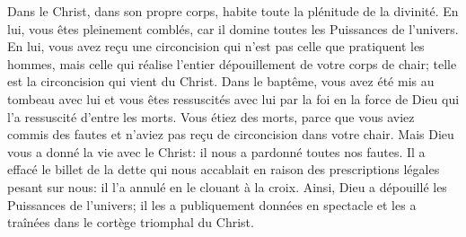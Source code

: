 Dans le Christ, dans son propre corps, habite toute la plénitude de la divinité.
En lui, vous êtes pleinement comblés, car il domine toutes les Puissances de l’univers.
En lui, vous avez reçu une circoncision qui n’est pas celle que pratiquent les hommes,
	mais celle qui réalise l’entier dépouillement de votre corps de chair;
	telle est la circoncision qui vient du Christ.
Dans le baptême, vous avez été mis au tombeau avec lui et vous êtes ressuscités avec lui
	par la foi en la force de Dieu qui l’a ressuscité d’entre les morts.
Vous étiez des morts, parce que vous aviez commis des fautes
	et n’aviez pas reçu de circoncision dans votre chair.
Mais Dieu vous a donné la vie avec le Christ:
	il nous a pardonné toutes nos fautes.
Il a effacé le billet de la dette qui nous accablait
		en raison des prescriptions légales pesant sur nous:
	il l’a annulé en le clouant à la croix.
Ainsi, Dieu a dépouillé les Puissances de l’univers;
	il les a publiquement données en spectacle
		et les a traînées dans le cortège triomphal du Christ.
